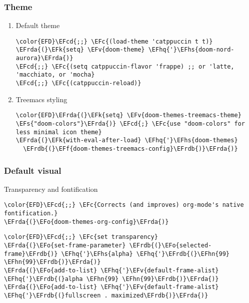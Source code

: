 \documentclass[c]{article}
\theoremstyle{plain}%
\theoremstyle{definition}
\theoremstyle{remark}
\newcommand{\EFc}[1]{\textcolor{EFc}{#1}} %
\newcommand{\EFcd}[1]{\textcolor{EFcd}{#1}} %
\newcommand{\EFs}[1]{\textcolor{EFs}{#1}} %
\newcommand{\EFk}[1]{\textcolor{EFk}{#1}} %
\newcommand{\EFf}[1]{\textcolor{EFf}{#1}} %
\newcommand{\EFv}[1]{\textcolor{EFv}{#1}} %
\newcommand{\EFo}[1]{\textcolor{EFo}{#1}} %
\newcommand{\EFhn}[1]{\textcolor{EFhn}{\textbf{#1}}} %
\newcommand{\EFhq}[1]{\textcolor{EFhq}{#1}} %
\newcommand{\EFhs}[1]{\textcolor{EFhs}{#1}} %
\newcommand{\EFrda}[1]{\textcolor{EFrda}{#1}} %
\newcommand{\EFrdb}[1]{\textcolor{EFrdb}{#1}} %
\begin{document}
\subsubsection{Theme}
\label{sec:orgc113407}
\begin{enumerate}
\item Default theme
\label{sec:org8f4d492}
\begin{Code}
\begin{Verbatim}
\color{EFD}\EFcd{;;} \EFc{(load-theme 'catppuccin t t)}
\EFrda{(}\EFk{setq} \EFv{doom-theme} \EFhq{'}\EFhs{doom-nord-aurora}\EFrda{)}
\EFcd{;;} \EFc{(setq catppuccin-flavor 'frappe) ;; or 'latte, 'macchiato, or 'mocha}
\EFcd{;;} \EFc{(catppuccin-reload)}
\end{Verbatim}
\end{Code}
\item Treemacs styling
\label{sec:org09fa1c3}
\begin{Code}
\begin{Verbatim}
\color{EFD}\EFrda{(}\EFk{setq} \EFv{doom-themes-treemacs-theme} \EFs{"doom-colors"}\EFrda{)} \EFcd{;} \EFc{use "doom-colors" for less minimal icon theme}
\EFrda{(}\EFk{with-eval-after-load} \EFhq{'}\EFhs{doom-themes}
  \EFrdb{(}\EFf{doom-themes-treemacs-config}\EFrdb{)}\EFrda{)}
\end{Verbatim}
\end{Code}
\end{enumerate}
\subsubsection{Default visual}
\label{sec:orgea55d0d}
Transparency and fontification
\begin{Code}
\begin{Verbatim}
\color{EFD}\EFcd{;;} \EFc{Corrects (and improves) org-mode's native fontification.}
\EFrda{(}\EFo{doom-themes-org-config}\EFrda{)}
\end{Verbatim}
\end{Code}
\begin{Code}
\begin{Verbatim}
\color{EFD}\EFcd{;;} \EFc{set transparency}
\EFrda{(}\EFo{set-frame-parameter} \EFrdb{(}\EFo{selected-frame}\EFrdb{)} \EFhq{'}\EFhs{alpha} \EFhq{'}\EFrdb{(}\EFhn{99} \EFhn{99}\EFrdb{)}\EFrda{)}
\EFrda{(}\EFo{add-to-list} \EFhq{'}\EFv{default-frame-alist} \EFhq{'}\EFrdb{(}alpha \EFhn{99} \EFhn{99}\EFrdb{)}\EFrda{)}
\EFrda{(}\EFo{add-to-list} \EFhq{'}\EFv{default-frame-alist} \EFhq{'}\EFrdb{(}fullscreen . maximized\EFrdb{)}\EFrda{)}
\end{Verbatim}
\end{Code}
\end{document}
